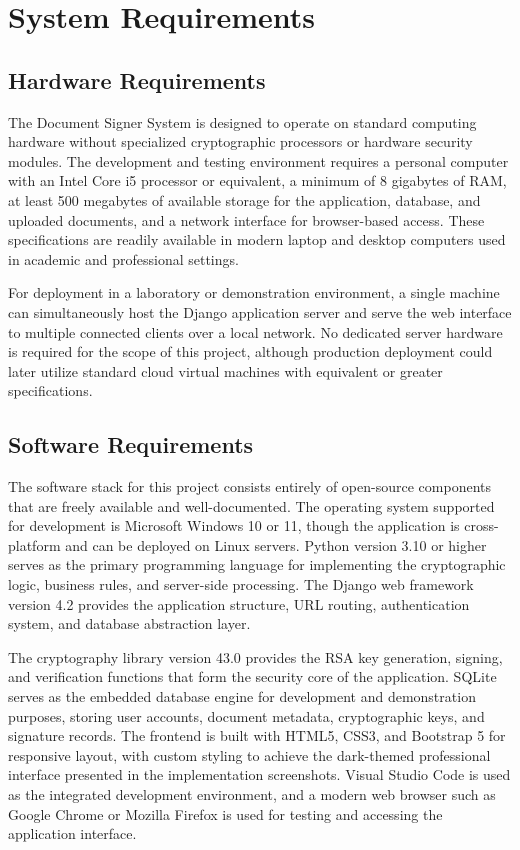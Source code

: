 \chapter{System Requirements}

\section{Hardware Requirements}

The Document Signer System is designed to operate on standard computing hardware without specialized cryptographic processors or hardware security modules. The development and testing environment requires a personal computer with an Intel Core i5 processor or equivalent, a minimum of 8 gigabytes of RAM, at least 500 megabytes of available storage for the application, database, and uploaded documents, and a network interface for browser-based access. These specifications are readily available in modern laptop and desktop computers used in academic and professional settings.

For deployment in a laboratory or demonstration environment, a single machine can simultaneously host the Django application server and serve the web interface to multiple connected clients over a local network. No dedicated server hardware is required for the scope of this project, although production deployment could later utilize standard cloud virtual machines with equivalent or greater specifications.

\section{Software Requirements}

The software stack for this project consists entirely of open-source components that are freely available and well-documented. The operating system supported for development is Microsoft Windows 10 or 11, though the application is cross-platform and can be deployed on Linux servers. Python version 3.10 or higher serves as the primary programming language for implementing the cryptographic logic, business rules, and server-side processing. The Django web framework version 4.2 provides the application structure, URL routing, authentication system, and database abstraction layer.

The cryptography library version 43.0 provides the RSA key generation, signing, and verification functions that form the security core of the application. SQLite serves as the embedded database engine for development and demonstration purposes, storing user accounts, document metadata, cryptographic keys, and signature records. The frontend is built with HTML5, CSS3, and Bootstrap 5 for responsive layout, with custom styling to achieve the dark-themed professional interface presented in the implementation screenshots. Visual Studio Code is used as the integrated development environment, and a modern web browser such as Google Chrome or Mozilla Firefox is used for testing and accessing the application interface.

